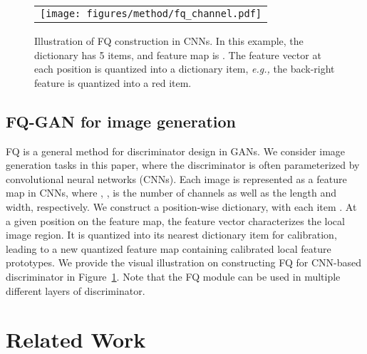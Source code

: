 \documentclass{article}
\newcommand{\eg}[0]{\emph{e.g., }}
\begin{document}
\begin{figure}[t!]\vspace{-0mm}\centering
	\begin{tabular}{c}
		\hspace{-3mm}
		\texttt{[image: figures/method/fq\_channel.pdf]} 
	\end{tabular}
	\vspace{-2mm}
	\caption{Illustration of FQ construction in CNNs. In this example, the dictionary has 5 items, and feature map is . The feature vector at each position is quantized into a dictionary item, \eg the back-right feature is quantized into a red item.
	 }
	\vspace{-2mm}
	\label{fig:fq_cnn_schemes}
\end{figure}


\vspace{-2mm}
\subsection{FQ-GAN for image generation}
FQ is a general method for discriminator design in GANs. We consider image generation tasks in this paper, where the discriminator is often parameterized by convolutional neural networks (CNNs). Each image is represented as a feature map  in CNNs, where , ,  is the number of channels as well as the length and width, respectively. We construct a position-wise dictionary, with each item . At a given position on the feature map, the feature vector characterizes the local image region. It is quantized into its nearest dictionary item for calibration, leading to a new quantized feature map  containing calibrated local feature prototypes.
We provide the visual illustration on constructing FQ for CNN-based discriminator in Figure~\ref{fig:fq_cnn_schemes}. Note that the FQ module can be used in multiple different layers of discriminator. 


















\vspace{-1mm}
\section{Related Work}
\vspace{-0mm}
\end{document}
